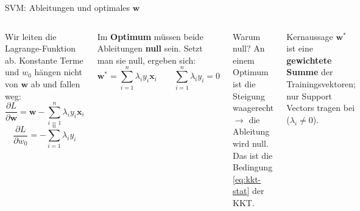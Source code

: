\begin{frame}{SVM: Ableitungen und optimales $\mathbf{w}$}
\small
\begin{columns}
Wir leiten die Lagrange-Funktion ab. Konstante Terme und $w_0$ hängen nicht
von $\mathbf{w}$ ab und fallen weg:
\[
  \frac{\partial L}{\partial \mathbf{w}} =
  \mathbf{w} - \sum_{i=1}^{n} \lambda_i y_i \mathbf{x}_i
\]
\[
  \frac{\partial L}{\partial w_0} =
  -\sum_{i=1}^{n} \lambda_i y_i
\]

\vspace{0.3em}
Im \textbf{Optimum} müssen beide Ableitungen \textbf{null} sein. Setzt man sie null, ergeben sich:
\[
  \mathbf{w}^{*} = \sum_{i=1}^{n} \lambda_i y_i \mathbf{x}_i
  \qquad
  \sum_{i=1}^{n} \lambda_i y_i = 0
\]

\begin{block}{\small Warum null?} 
    An einem Optimum ist die Steigung waagerecht $\rightarrow$ die
Ableitung wird null. Das ist die Bedingung \eqref{eq:kkt-stat} der KKT.
\end{block}

\vspace{0.3em}
\begin{blockC2}{\small Kernaussage} 
 $\mathbf{w}^{*}$ ist eine \textbf{gewichtete Summe}
der Trainingsvektoren; nur Support Vectors tragen bei ($\lambda_i \neq 0$).
\end{blockC2}
\end{columns}


\end{frame}

